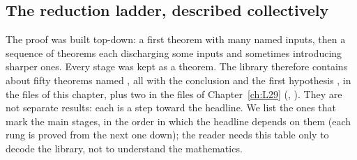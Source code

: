 \subsection{The reduction ladder, described collectively}\label{l28:sec:ladder}

The proof was built top-down: a first theorem with many named inputs, then a sequence of theorems each discharging some inputs
and sometimes introducing sharper ones. Every stage was kept as a theorem. The library therefore contains about fifty theorems
named , all with the conclusion  and
the first hypothesis , in the files of this chapter, plus two in the files of Chapter~\ref{ch:L29}
(, ). They are not separate results: each is a step toward the headline. We list the
ones that mark the main stages, in the order in which the headline depends on them (each rung is proved from the next one down);
the reader needs this table only to decode the library, not to understand the mathematics.
